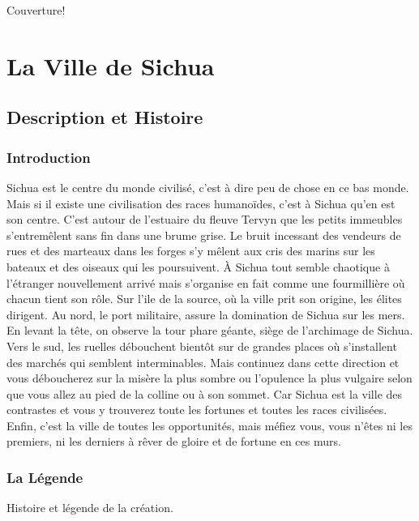 \documentclass{dd}
\begin{document}
Couverture!

\clearpage

\tableofcontents

\part{La Ville de Sichua}

\chapter{Description et Histoire}

\section{Introduction}

Sichua est le centre du monde civilisé, c'est à dire peu de chose en ce bas monde.
Mais si il existe une civilisation des races humanoïdes, c'est à Sichua qu'en est 
son centre. C'est autour de l'estuaire du fleuve Tervyn que les petits immeubles 
s'entremêlent sans fin dans une brume grise. Le bruit
incessant des vendeurs de rues et des marteaux dans les forges s'y mêlent aux cris
des marins sur les bateaux et des oiseaux qui les poursuivent. À Sichua 
tout semble chaotique à l'étranger nouvellement arrivé mais
s'organise en fait comme une fourmillière où chacun tient son rôle. Sur l'ile de 
la source, où la ville prit son origine, les élites dirigent. Au nord, le port 
militaire, assure la domination de Sichua sur les mers. En levant la tête, on 
observe la tour phare géante, siège de l'archimage de Sichua. Vers le sud, les 
ruelles débouchent bientôt sur de grandes places où s'installent des marchés qui
semblent interminables. Mais continuez dans cette direction et vous déboucherez
sur la misère la plus sombre ou l'opulence la plus vulgaire selon que vous allez 
au pied de la colline ou à son sommet. Car Sichua est la ville des contrastes
et vous y trouverez toute les fortunes et toutes les races civilisées. Enfin,
c'est la ville de toutes les opportunités, mais méfiez vous, vous n'êtes ni les 
premiers, ni les derniers à rêver de gloire et de fortune en ces murs.

\section{La Légende}

Histoire et légende de la création.



\end{document}
